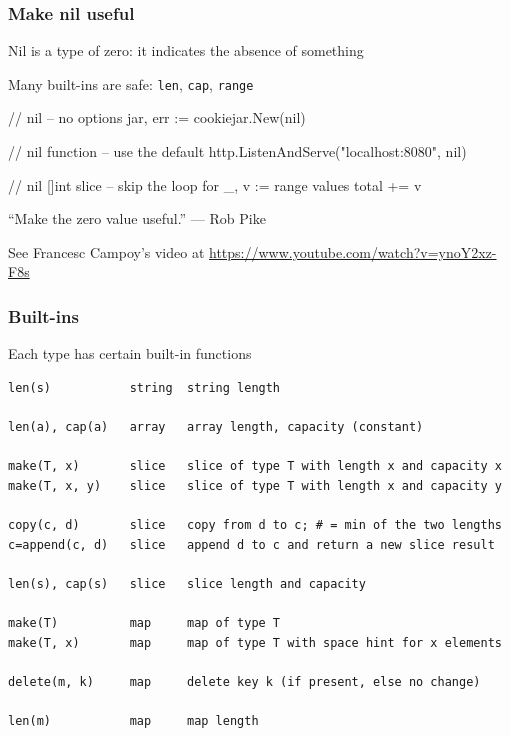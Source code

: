 \documentclass[handout,compress,t,11pt]{beamer}
\begin{document}
\begin{frame}[fragile]
    \frametitle{Make nil useful}
    Nil is a type of zero: it indicates the absence of something \par
    \vspace{0.2\baselineskip}
    Many built-ins are safe: \verb|len|, \verb|cap|, \verb|range| \par
    \vspace{0.4\baselineskip}
\begin{golang}
    // nil -- no options
    jar, err := cookiejar.New(nil)

    // nil function -- use the default
    http.ListenAndServe("localhost:8080", nil)

    // nil []int slice -- skip the loop
    for _, v := range values {
        total += v
    }
\end{golang}
\vspace{0.6\baselineskip}
``Make the zero value useful.'' --- Rob Pike \par
\vspace{-0.4\baselineskip}
{\scriptsize See Francesc Campoy's video at \href{https://www.youtube.com/watch?v=ynoY2xz-F8s}%
{https://www.youtube.com/watch?v=ynoY2xz-F8s}}
\end{frame}

\begin{frame}[fragile]
    \frametitle{Built-ins}
    Each type has certain built-in functions \par
    \vspace{0.5\baselineskip}
{\scriptsize\begin{verbatim}
len(s)           string  string length

len(a), cap(a)   array   array length, capacity (constant)

make(T, x)       slice   slice of type T with length x and capacity x
make(T, x, y)    slice   slice of type T with length x and capacity y

copy(c, d)       slice   copy from d to c; # = min of the two lengths
c=append(c, d)   slice   append d to c and return a new slice result

len(s), cap(s)   slice   slice length and capacity

make(T)          map     map of type T
make(T, x)       map     map of type T with space hint for x elements

delete(m, k)     map     delete key k (if present, else no change)

len(m)           map     map length
\end{verbatim}}
\end{frame}
\end{document}
